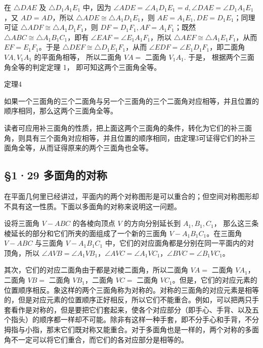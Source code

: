 在 \(\triangle DAE\) 及 \(\triangle D_{1}A_{1}E_{1}\) 中，因为
\(\angle ADE = \angle A_{1}D_{1}E_{1} = d, \angle DAE = \angle D_{1}A_{1}E_{1}\)，又
\(AD = AD\)，所以 \(\triangle ADE \cong \triangle A_{1}D_{1}E_{1}\)，则
\(AE = A_{1}E_{1}, DE = D_{1}E_{1}\)；同理可证
\(\triangle ADF \cong \triangle A_{1}D_{1}F_{1}\)，则
\(DF = D_{1}F_{1}, AF = A_{1}F_{1}\)；既然
\(\triangle ABC \cong \triangle A_{1}B_{1}C_{1}\)，即有
\(\angle EAF = \angle E_{1}A_{1}F_{1}\)，所以
\(\triangle AEF \cong \triangle A_{1}E_{1}F_{1}\)，从而
\(EF = E_{1}F_{1}\)。于是
\(\triangle DEF \cong \triangle D_{1}E_{1}F_{1}\)，从而
\(\angle EDF = \angle E_{1}D_{1}F_{1}\)，即二面角 \(VA, V_{1}A_{1}\)
的平面角相等， 所以二面角 \(VA =\) 二面角 \(V_{1}A_{1}\). 于是，
根据两个三面角全等的判定定理 1， 即可知这两个三面角全等。

定理4

如果一个三面角的三个二面角与另一个三面角的三个二面角对应相等，并且位置的顺序相同，那么这两个三面角全等。

读者可应用补三面角的性质，把上面这两个三面角的条件，转化为它们的补三面角，则具有三个面角对应相等，并且位置的顺序相同，由定理3可证得它们的补三面角全等，从而证得原来的两个三面角也全等。

\subsection{§1·29
多面角的对称}

在平面几何里已经讲过，平面内的两个对称图形是可以重合的；但空间对称图形却不具有这一性质。下面以多面角的对称来说明这一问题。

设将三面角 \(V - ABC\) 的各棱向顶点 \(V\) 的方向分别延长到
\(A_{1}, B_{1}, C_{1}\)，
那么这三条棱延长的部分和它们所夹的面组成了一个新的三面角
\(V - A_{1}B_{1}C_{1}\)。在三面角 \(V - ABC\) 与三面角
\(V - A_{1}B_{1}C_{1}\)
中，它们的对应面角都是分别在同一平面内的对顶角，所以
\(\angle AVB = \angle A_{1}VB_{1}\)，\(\angle AVC = \angle A_{1}VC_{1}\)，\(\angle BVC = \angle B_{1}VC_{1}\)。

其次，它们的对应二面角由于都是对棱二面角，所以二面角 \({VA} =\) 二面角
\({VA}_{1}\)，二面角 \(VB =\) 二面角 \(VB_{1}\)，二面角 \(VC =\) 二面角
\(VC_{1}\)。但是，它们的对应元素的位置顺序相反。象这样的两个三面角称为对称的。对称的三面角的对应元素是相等的，但是对应元素的位置顺序正好相反，所以它们不能重合。例如，可以把两只手套看作是对称的，但是要把它们套起来，使各个对应部分（即手心、手背、以及五个指头）的顺序都一样却不可能。除非有这样一种手套，即不分手心和手背，不分拇指与小指，那末它们既对称又能重合。对于多面角也是一样的，两个对称的多面角不一定可以将它们重合，而它们的各对应部分是相等的。

